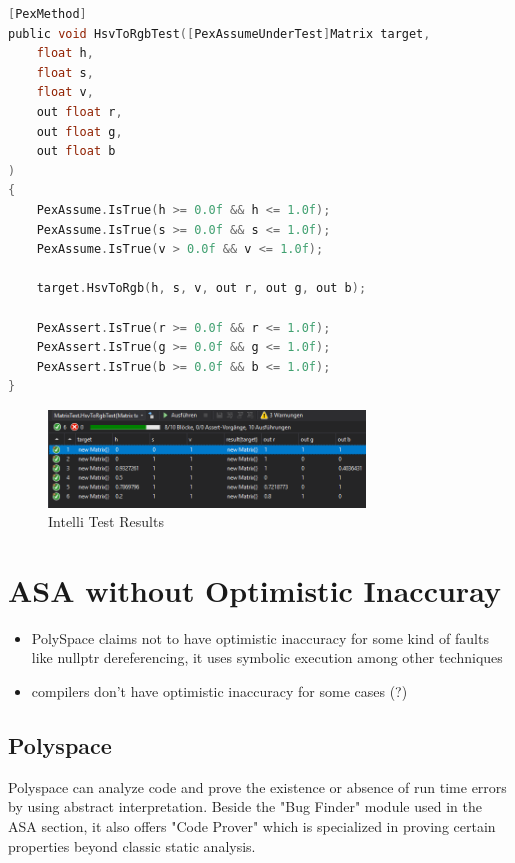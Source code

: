 \documentclass{scrreprt}
\begin{document}
\begin{lstlisting}[language=C]
[PexMethod]
public void HsvToRgbTest([PexAssumeUnderTest]Matrix target,
	float h,
	float s,
	float v,
	out float r,
	out float g,
	out float b
)
{
	PexAssume.IsTrue(h >= 0.0f && h <= 1.0f);
	PexAssume.IsTrue(s >= 0.0f && s <= 1.0f);
	PexAssume.IsTrue(v > 0.0f && v <= 1.0f);
	
	target.HsvToRgb(h, s, v, out r, out g, out b);
	
	PexAssert.IsTrue(r >= 0.0f && r <= 1.0f);
	PexAssert.IsTrue(g >= 0.0f && g <= 1.0f);
	PexAssert.IsTrue(b >= 0.0f && b <= 1.0f);
}
\end{lstlisting}

\begin{figure}[h]
	\centering
	\includegraphics[width=0.75\textwidth]{img/matrix_intelli_test.PNG}
	\caption[Intelli Test Results]{Intelli Test Results}
	\label{fig:matrix_intelli_test}
\end{figure}

\section{ASA without Optimistic Inaccuray}

\begin{itemize}
	\item PolySpace claims not to have optimistic inaccuracy for some kind of faults like nullptr dereferencing, it uses symbolic execution among other techniques
	\item compilers don't have optimistic inaccuracy for some cases (?)
\end{itemize}

\subsection{Polyspace}

Polyspace can analyze code and prove the existence or absence of run time errors by using abstract interpretation. Beside the "Bug Finder" module used in the ASA section, it also offers "Code Prover" which is specialized in proving certain properties beyond classic static analysis.
\end{document}
